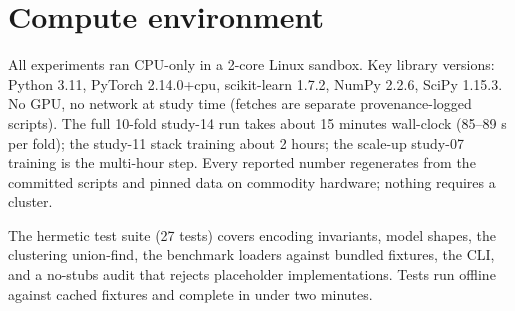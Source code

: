 
\section{Compute environment}\label{app:env}
All experiments ran CPU-only in a 2-core Linux sandbox. Key library
versions: Python 3.11, PyTorch 2.14.0+cpu, scikit-learn 1.7.2, NumPy
2.2.6, SciPy 1.15.3. No GPU, no network at study time (fetches are
separate provenance-logged scripts). The full 10-fold study-14 run takes
about 15 minutes wall-clock (85--89 s per fold); the study-11 stack
training about 2 hours; the scale-up study-07 training is the multi-hour
step. Every reported number regenerates from the committed scripts and
pinned data on commodity hardware; nothing requires a cluster.

The hermetic test suite (27 tests) covers encoding invariants, model
shapes, the clustering union-find, the benchmark loaders against bundled
fixtures, the CLI, and a no-stubs audit that rejects placeholder
implementations. Tests run offline against cached fixtures and complete
in under two minutes.
